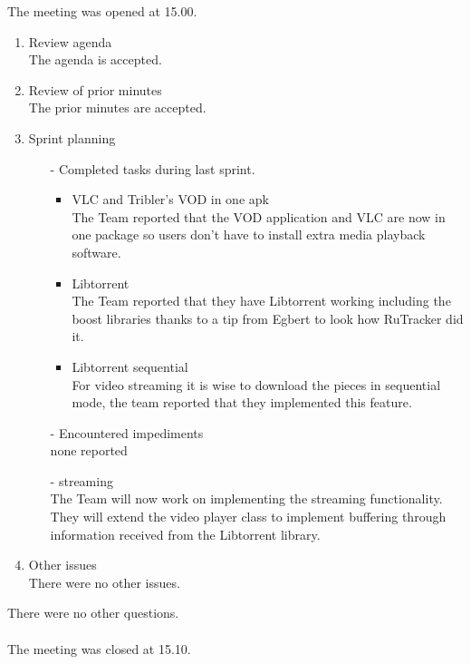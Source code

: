 \documentclass[pdftex, 12pt, a4paper]{report}
\begin{document}
\pagestyle{fancy}

The meeting was opened at 15.00.

\begin{enumerate}
\item Review agenda\\
The agenda is accepted.
\item Review of prior minutes \\
The prior minutes are accepted.
\item Sprint planning\\
\begin{enumerate}
\item[-] Completed tasks during last sprint.\\
	\begin{itemize}
	\item VLC and Tribler's VOD in one apk\\
	The Team reported that the VOD application and VLC are now in one package so users don't have to install extra media playback software.
	\item Libtorrent\\
	The Team reported that they have Libtorrent working including the boost libraries thanks to a tip from Egbert to look how RuTracker did it.
	\item Libtorrent sequential\\
	For video streaming it is wise to download the pieces in sequential mode, the team reported that they implemented this feature. 
	\end{itemize}
\item[-] Encountered impediments\\
none reported
\item[-] streaming\\
The Team will now work on implementing the streaming functionality. They will extend the video player class to implement buffering through information received from the Libtorrent library. 
\end{enumerate}
\item Other issues\\
There were no other issues.
\end{enumerate}
There were no other questions.\\
\\
The meeting was closed at 15.10.
\end{document}
